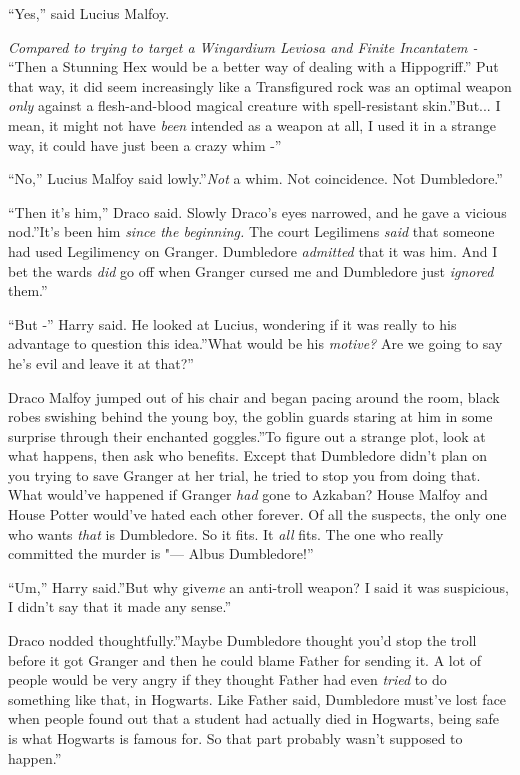 ``Yes,'' said Lucius Malfoy.

\emph{Compared to trying to target a Wingardium Leviosa and Finite
Incantatem -} ``Then a Stunning Hex would be a better way of dealing
with a Hippogriff.'' Put that way, it did seem increasingly like a
Transfigured rock was an optimal weapon \emph{only} against a
flesh-and-blood magical creature with spell-resistant skin.''But...
I mean, it might not have \emph{been} intended as a weapon at all, I
used it in a strange way, it could have just been a crazy whim -''

``No,'' Lucius Malfoy said lowly.''\emph{Not} a whim. Not coincidence.
Not Dumbledore.''

``Then it's him,'' Draco said. Slowly Draco's eyes narrowed, and he gave
a vicious nod.''It's been him \emph{since the beginning.} The court
Legilimens \emph{said} that someone had used Legilimency on Granger.
Dumbledore \emph{admitted} that it was him. And I bet the wards
\emph{did} go off when Granger cursed me and Dumbledore just
\emph{ignored} them.''

``But -'' Harry said. He looked at Lucius, wondering if it was really to
his advantage to question this idea.''What would be his \emph{motive?}
Are we going to say he's evil and leave it at that?''

Draco Malfoy jumped out of his chair and began pacing around the room,
black robes swishing behind the young boy, the goblin guards staring at
him in some surprise through their enchanted goggles.''To figure out a
strange plot, look at what happens, then ask who benefits. Except that
Dumbledore didn't plan on you trying to save Granger at her trial, he
tried to stop you from doing that. What would've happened if Granger
\emph{had} gone to Azkaban? House Malfoy and House Potter would've hated
each other forever. Of all the suspects, the only one who wants
\emph{that} is Dumbledore. So it fits. It \emph{all} fits. The one who
really committed the murder is "--- Albus Dumbledore!''

``Um,'' Harry said.''But why give\emph{me} an anti-troll weapon? I said
it was suspicious, I didn't say that it made any sense.''

Draco nodded thoughtfully.''Maybe Dumbledore thought you'd stop the
troll before it got Granger and then he could blame Father for sending
it. A lot of people would be very angry if they thought Father had even
\emph{tried} to do something like that, in Hogwarts. Like Father said,
Dumbledore must've lost face when people found out that a student had
actually died in Hogwarts, being safe is what Hogwarts is famous for. So
that part probably wasn't supposed to happen.''

